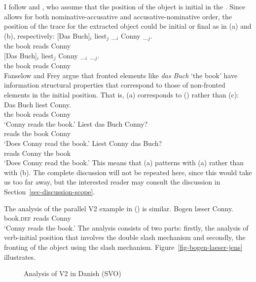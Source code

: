 I follow \citet{Fanselow2003d} and \citet{Frey2004a}, who assume that the position of the object is
initial in the \mf. Since  allows for both nominative-accusative and accusative-nominative
order, the position of the trace for the extracted object could be initial or final as in (a)
and (b), respectively:
\eal
\ex 
\gll {}[Das Buch]$_i$ liest$_j$ \_$_i$ Conny \_$_j$.\\
       \spacebr{}the book reads {} Conny\\
\ex 
\gll {}[Das Buch]$_i$ liest$_j$ Conny \_$_i$ \_$_j$.\\
       \spacebr{}the book reads Conny\\
\zl
Fanselow and Frey argue that fronted elements like \emph{das Buch} `the book' have information structural properties
that correspond to those of non-fronted elements in the initial \mf position. That is, (a)
corresponds to () rather than (c):
\eal
\ex
\gll Das Buch liest Conny.\\
     the book reads Conny\\
\glt `Conny reads the book.'
\ex
\gll Liest das Buch Conny?\\
     reads the book Conny\\
\glt `Does Conny read the book.'
\ex
\gll Liest Conny das Buch?\\
     reads Conny the book\\
\glt `Does Conny read the book.'
\zl
This means that (a) patterns with (a) rather than with (b).
The complete discussion will not be repeated here, since this would take us too far away, but the
interested reader may consult the discussion in Section~\ref{sec-discussion-scope}.

\largerpage
The analysis of the parallel  V2 example in () is similar. 
\ea
\gll Bogen             læser Conny.\\
     book.\textsc{def} reads Conny\\
\glt `Conny reads the book.'
\z
The analysis consists of two parts: firstly, the analysis of verb-initial position that involves the
double slash mechanism and secondly, the fronting of the object using the slash
mechanism. Figure~\vref{fig-bogen-laeser-jens} illustrates.
\begin{figure}
\scalebox{.95}{%
\begin{forest}
sm edges
[S
   [NP$_i$ [bogen;book.\textsc{def}] ]
      [S/NP
         [V \sliste{ S//V }
           [V [læser$_j$;reads] ] ]
           [S//\vSLASHnp
             [NP [Conny;Conny] ]
             [VP//\vSLASHnp
               [V//V  [\_$_j$] ]
               [NP/NP [\trace$_i$ ] ] ] ] ] ] ] 
\end{forest}}
\caption{\label{fig-bogen-laeser-jens}Analysis of V2 in Danish (SVO)}
\end{figure}

